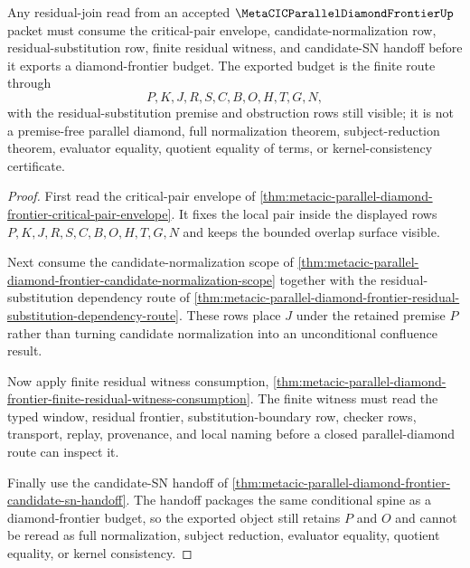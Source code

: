 \begin{theorem}
\label{thm:metacic-parallel-diamond-residual-normalization-scope}
Any residual-join read from an accepted $\MetaCICParallelDiamondFrontierUp$ packet must consume the critical-pair envelope, candidate-normalization row, residual-substitution row, finite residual witness, and candidate-SN handoff before it exports a diamond-frontier budget. The exported budget is the finite route through
$$
P,K,J,R,S,C,B,O,H,T,G,N ,
$$
with the residual-substitution premise and obstruction rows still visible; it is not a premise-free parallel diamond, full normalization theorem, subject-reduction theorem, evaluator equality, quotient equality of terms, or kernel-consistency certificate.
\end{theorem}
\begin{proof}
First read the critical-pair envelope of \autoref{thm:metacic-parallel-diamond-frontier-critical-pair-envelope}. It fixes the local pair inside the displayed rows $P,K,J,R,S,C,B,O,H,T,G,N$ and keeps the bounded overlap surface visible.

Next consume the candidate-normalization scope of \autoref{thm:metacic-parallel-diamond-frontier-candidate-normalization-scope} together with the residual-substitution dependency route of \autoref{thm:metacic-parallel-diamond-frontier-residual-substitution-dependency-route}. These rows place $J$ under the retained premise $P$ rather than turning candidate normalization into an unconditional confluence result.

Now apply finite residual witness consumption, \autoref{thm:metacic-parallel-diamond-frontier-finite-residual-witness-consumption}. The finite witness must read the typed window, residual frontier, substitution-boundary row, checker rows, transport, replay, provenance, and local naming before a closed parallel-diamond route can inspect it.

Finally use the candidate-SN handoff of \autoref{thm:metacic-parallel-diamond-frontier-candidate-sn-handoff}. The handoff packages the same conditional spine as a diamond-frontier budget, so the exported object still retains $P$ and $O$ and cannot be reread as full normalization, subject reduction, evaluator equality, quotient equality, or kernel consistency.
\end{proof}

